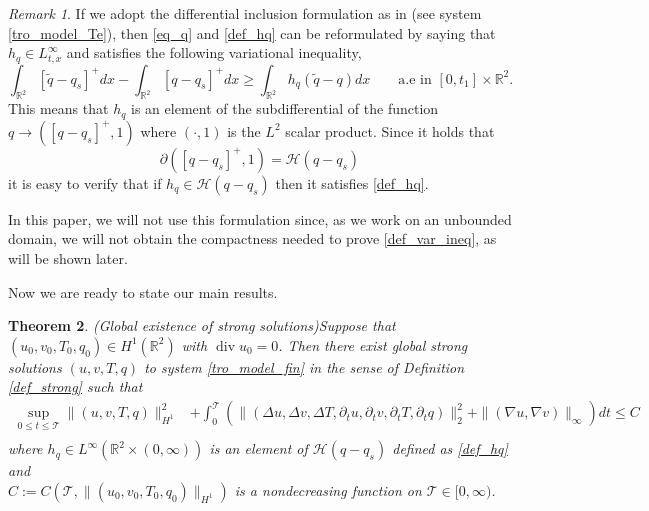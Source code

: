 \documentclass[11pt, a4paper, article,reqno,]{amsart}
\newtheorem{theorem}{Theorem}[section]
\theoremstyle{remark}
\newtheorem{remark}[theorem]{Remark}
\DeclareMathOperator{\dive}{div}
\numberwithin{equation}{section}
\begin{document}
\begin{remark}
If we adopt the differential inclusion formulation  as in \cite{CZ} (see system \eqref{tro_model_Te}), then \eqref{eq_q} and \eqref{def_hq} can be reformulated by saying that $h_q \in L^{\infty}_{t,x}$ and satisfies the following variational inequality,
\begin{equation}\label{def_var_ineq}
     \int_{\mathbb{R}^2}[\tilde{q}-q_s]^+dx - \int_{\mathbb{R}^2} [q-q_s]^+dx \geq  \int_{\mathbb{R}^2} h_q (\tilde{q}-q) dx \qquad \text{a.e in } [0,t_1] \times \mathbb{R}^2. 
\end{equation}
This means that $h_q$ is an element of the subdifferential of the function $q \rightarrow ([q-q_s]^+,1)$ where $(\cdot, 1)$ is the $L^2$ scalar product. Since it holds that
\begin{equation*}
    \partial([q-q_s]^+,1) = \mathcal{H}(q-q_s)
\end{equation*}
 it is easy to verify that if $h_q \in \mathcal{H}(q-q_s)$  then it satisfies \eqref{def_hq}.

In this paper, we will not use this formulation since, as we work on an unbounded domain, we will not obtain the compactness needed to prove \eqref{def_var_ineq}, as will be shown later.
\end{remark}

Now we are ready to state our main results.
\begin{theorem}(Global existence of strong solutions)\label{thm_final}
Suppose that $(u_0,v_0,T_{0},q_0) \in H^1(\mathbb{R}^2)$ with $\dive u_0=0$. Then there exist global strong solutions $(u,v,T,q)$ to system \eqref{tro_model_fin} in the sense of Definition \ref{def_strong} such that
\begin{equation}\label{ene_fin}
     \begin{aligned}
        \sup_{0 \leq t \leq \mathcal{T}}\|(u,v,T, q)\|_{H^1}^2 & + \int_0^\mathcal{T} (\|(\Delta u, \Delta v, \Delta T,\partial_t u, \partial_t v, \partial_t T, \partial_t q)\|_2^2 + \|(\nabla u, \nabla v)\|_{\infty})dt \leq C\\
    \end{aligned}
\end{equation}
where $h_q \in L^{\infty}(\mathbb{R}^2 \times (0, \infty))$ is an element of $\mathcal{H}(q-q_s)$ defined as \eqref{def_hq} and \\
$C:= C(\mathcal{T}, \|(u_0,v_0,T_{0},q_0)\|_{H^1}) $ is a nondecreasing function on $\mathcal{T} \in [0,\infty)$. 
\end{theorem}
\end{document}
